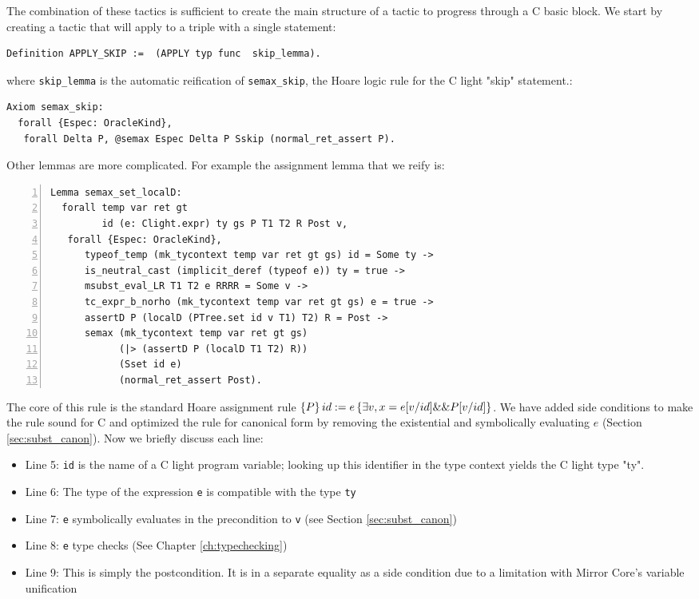 \documentclass{puthesis}
\begin{document}
The combination of these tactics is sufficient to create the main
structure of a tactic to progress through a C basic block. We start by
creating a tactic that will apply to a triple with a single statement:

\begin{lstlisting}
Definition APPLY_SKIP :=  (APPLY typ func  skip_lemma).
\end{lstlisting}
where \lstinline|skip_lemma| is the automatic reification of
\lstinline|semax_skip|, the Hoare logic rule for the C light "skip" statement.:

\begin{lstlisting}
Axiom semax_skip:
  forall {Espec: OracleKind},
   forall Delta P, @semax Espec Delta P Sskip (normal_ret_assert P).
\end{lstlisting}

 Other lemmas are more
complicated. For example the assignment lemma that we reify is:

\begin{lstlisting}[numbers=left]
Lemma semax_set_localD:
  forall temp var ret gt 
         id (e: Clight.expr) ty gs P T1 T2 R Post v,
   forall {Espec: OracleKind},
      typeof_temp (mk_tycontext temp var ret gt gs) id = Some ty -> 
      is_neutral_cast (implicit_deref (typeof e)) ty = true ->
      msubst_eval_LR T1 T2 e RRRR = Some v ->
      tc_expr_b_norho (mk_tycontext temp var ret gt gs) e = true ->
      assertD P (localD (PTree.set id v T1) T2) R = Post ->
      semax (mk_tycontext temp var ret gt gs) 
            (|> (assertD P (localD T1 T2) R))
            (Sset id e)
            (normal_ret_assert Post).
\end{lstlisting}

The core of this rule is the standard Hoare assignment rule
$\{P\}\,id:=e\,\{\exists v, x=e[v/id] \&\& P[v/id]\}$. We have added side
conditions to make the rule sound for C and optimized the rule for
canonical form by removing the existential and symbolically evaluating
$e$ (Section \ref{sec:subst_canon}). Now we briefly discuss each line:

\begin{itemize}
\item Line 5: \lstinline|id| is the name of a C light program
  variable; looking up this identifier in the type context yields the C light type "ty".
\item Line 6: The type of the expression \lstinline|e| is compatible
  with the type \lstinline|ty|
\item Line 7: \lstinline|e| symbolically evaluates in the precondition
  to \lstinline|v| (see Section \ref{sec:subst_canon})
\item Line 8: \lstinline|e| type checks (See Chapter
  \ref{ch:typechecking})
\item Line 9: This is simply the postcondition. It is in a separate
  equality as a side condition due to a limitation with Mirror Core's
  variable unification
\end{itemize}
\end{document}
